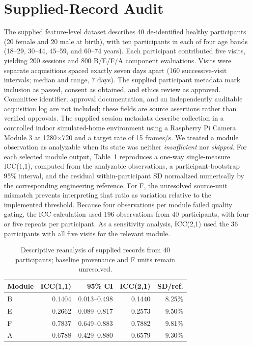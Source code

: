 \section{Supplied-Record Audit}
\label{app:record_audit}

The supplied feature-level dataset describes 40 de-identified healthy participants (20
female and 20 male at birth), with ten participants in each of four age bands
(18--29, 30--44, 45--59, and 60--74 years). Each participant contributed five
visits, yielding 200 sessions and 800 B/E/F/A component evaluations. Visits were
separate acquisitions spaced exactly seven days apart (160 successive-visit
intervals; median and range, 7 days). The
supplied participant metadata mark inclusion as passed, consent as obtained,
and ethics review as approved. Committee identifier, approval documentation,
and an independently auditable acquisition log are not included; these fields
are source assertions rather than verified approvals. The supplied session metadata describe collection in a controlled
indoor simulated-home environment using a Raspberry Pi Camera Module 3 at
1280$\times$720 and a
target rate of 15 frames/s. We treated a module observation as analyzable when its
state was neither \textit{insufficient} nor \textit{skipped}. For each
selected module output, Table~\ref{tab:human_repeatability} reproduces a
one-way single-measure ICC(1,1), computed from the analyzable observations, a
participant-bootstrap 95\% interval, and the residual within-participant SD
normalized numerically by the corresponding engineering reference. For F, the
unresolved source-unit mismatch prevents interpreting that ratio as variation
relative to the implemented threshold. Because four
observations per module failed quality gating, the ICC calculation used 196
observations from 40 participants, with four or five repeats per participant.
As a sensitivity analysis, ICC(2,1) used the 36 participants with all five
visits for the relevant module.

\begin{table}[htbp]
\centering
\caption{Descriptive reanalysis of supplied records from 40 participants; baseline provenance and F units remain unresolved.}
\label{tab:human_repeatability}
\footnotesize
\setlength{\tabcolsep}{3pt}
\renewcommand{\arraystretch}{1.03}
\begin{tabular}{@{}lrrrr@{}}
\toprule
\textbf{Module} & \textbf{ICC(1,1)} & \textbf{95\% CI} & \textbf{ICC(2,1)} & \textbf{SD/ref.} \\
\midrule
B & 0.1404 & 0.013--0.498 & 0.1440 & 8.25\% \\
E & 0.2662 & 0.089--0.817 & 0.2573 & 9.50\% \\
F & 0.7837 & 0.649--0.883 & 0.7882 & 9.81\% \\
A & 0.6788 & 0.429--0.880 & 0.6579 & 9.30\% \\
\bottomrule
\end{tabular}
\end{table}

